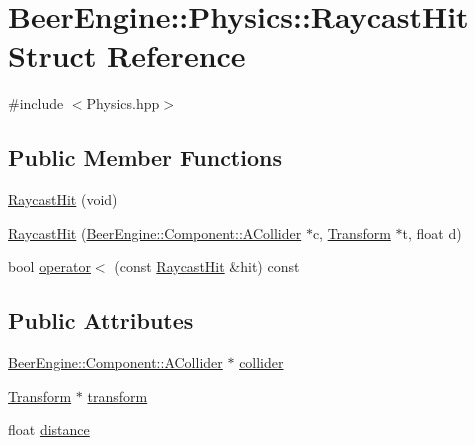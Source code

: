 \hypertarget{struct_beer_engine_1_1_physics_1_1_raycast_hit}{}\section{Beer\+Engine\+:\+:Physics\+:\+:Raycast\+Hit Struct Reference}
\label{struct_beer_engine_1_1_physics_1_1_raycast_hit}


{\ttfamily \#include $<$Physics.\+hpp$>$}

\subsection*{Public Member Functions}
\begin{DoxyCompactItemize}
\item 
\mbox{\hyperlink{struct_beer_engine_1_1_physics_1_1_raycast_hit_a8395ce0eae1b9205fa860d9bf883329e}{Raycast\+Hit}} (void)
\item 
\mbox{\hyperlink{struct_beer_engine_1_1_physics_1_1_raycast_hit_a3a90e49816f4e619b4cdf863f9d0d285}{Raycast\+Hit}} (\mbox{\hyperlink{class_beer_engine_1_1_component_1_1_a_collider}{Beer\+Engine\+::\+Component\+::\+A\+Collider}} $\ast$c, \mbox{\hyperlink{class_beer_engine_1_1_transform}{Transform}} $\ast$t, float d)
\item 
bool \mbox{\hyperlink{struct_beer_engine_1_1_physics_1_1_raycast_hit_a985cc0a92cdc84779d87a28557c58a0d}{operator$<$}} (const \mbox{\hyperlink{struct_beer_engine_1_1_physics_1_1_raycast_hit}{Raycast\+Hit}} \&hit) const
\end{DoxyCompactItemize}
\subsection*{Public Attributes}
\begin{DoxyCompactItemize}
\item 
\mbox{\hyperlink{class_beer_engine_1_1_component_1_1_a_collider}{Beer\+Engine\+::\+Component\+::\+A\+Collider}} $\ast$ \mbox{\hyperlink{struct_beer_engine_1_1_physics_1_1_raycast_hit_a89dc9cb3b03c9c47d15a15e60e4be44a}{collider}}
\item 
\mbox{\hyperlink{class_beer_engine_1_1_transform}{Transform}} $\ast$ \mbox{\hyperlink{struct_beer_engine_1_1_physics_1_1_raycast_hit_aaf554d2ee6c3eb56b7af00d5a26ad006}{transform}}
\item 
float \mbox{\hyperlink{struct_beer_engine_1_1_physics_1_1_raycast_hit_aa417105761ef05052ea03b8f566c6c45}{distance}}
\end{DoxyCompactItemize}


